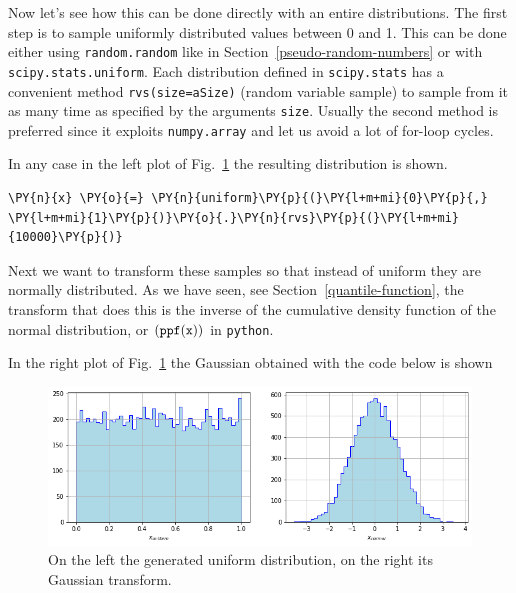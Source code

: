 Now let's see how this can be done directly with an entire distributions. The first step is to sample
uniformly distributed values between 0 and 1. This can be done either using \texttt{random.random} 
like in Section~\ref{pseudo-random-numbers} or with \texttt{scipy.stats.uniform}. 
Each distribution defined in \texttt{scipy.stats} has a convenient method \texttt{rvs(size=aSize)} 
(random variable sample) to sample from it as many time as specified by the arguments \texttt{size}. 
Usually the second method is preferred since it exploits \texttt{numpy.array} and let us avoid a lot of for-loop cycles.

In any case in the left plot of Fig.~\ref{fig:uniform_and_gauss} the resulting distribution is shown.

\begin{tcolorbox}[breakable, size=fbox, boxrule=1pt, pad at break*=1mm,colback=cellbackground, colframe=cellborder]
\begin{Verbatim}[commandchars=\\\{\}]
\PY{n}{x} \PY{o}{=} \PY{n}{uniform}\PY{p}{(}\PY{l+m+mi}{0}\PY{p}{,} \PY{l+m+mi}{1}\PY{p}{)}\PY{o}{.}\PY{n}{rvs}\PY{p}{(}\PY{l+m+mi}{10000}\PY{p}{)}
\end{Verbatim}
\end{tcolorbox}

Next we want to transform these samples so that instead of uniform they
are normally distributed. As we have seen, see Section~\ref{quantile-function}, the transform that does this
is the inverse of the cumulative density function of the normal 
distribution, or \((\tt{ppf(x))}\) in \texttt{python}. 

In the right plot of Fig.~\ref{fig:uniform_and_gauss} the Gaussian obtained 
with the code below is shown

\begin{figure}[h]
  \centering
  \includegraphics[width=1.\textwidth]{figures/uniform_gauss.png}
  \caption{On the left the generated uniform distribution, on the right its Gaussian transform.}
  \label{fig:uniform_and_gauss}
\end{figure}

